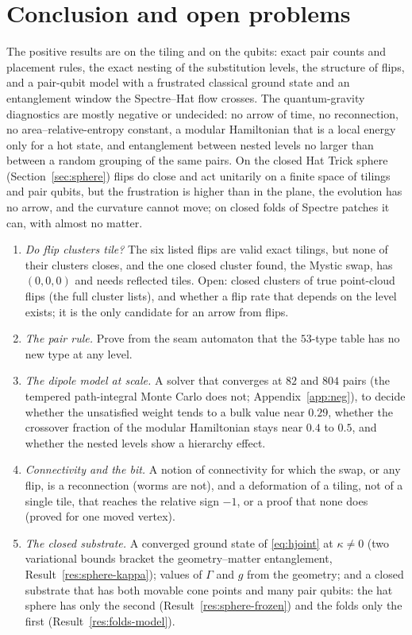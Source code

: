 \documentclass[11pt]{article}
\theoremstyle{definition}
\begin{document}
\section{Conclusion and open problems}
The positive results are on the tiling and on the qubits: exact pair counts and placement rules, the exact nesting of the substitution levels, the structure of flips, and a pair-qubit model with a frustrated classical ground state and an entanglement window the Spectre--Hat flow crosses. The quantum-gravity diagnostics are mostly negative or undecided: no arrow of time, no reconnection, no area--relative-entropy constant, a modular Hamiltonian that is a local energy only for a hot state, and entanglement between nested levels no larger than between a random grouping of the same pairs. On the closed Hat Trick sphere (Section~\ref{sec:sphere}) flips do close and act unitarily on a finite space of tilings and pair qubits, but the frustration is higher than in the plane, the evolution has no arrow, and the curvature cannot move; on closed folds of Spectre patches it can, with almost no matter.
\begin{enumerate}[leftmargin=1.6em,itemsep=1pt]
\item \emph{Do flip clusters tile?} The six listed flips are valid exact tilings, but none of their clusters closes, and the one closed cluster found, the Mystic swap, has $(0,0,0)$ and needs reflected tiles. Open: closed clusters of true point-cloud flips (the full cluster lists), and whether a flip rate that depends on the level exists; it is the only candidate for an arrow from flips.
\item \emph{The pair rule.} Prove from the seam automaton that the $53$-type table has no new type at any level.
\item \emph{The dipole model at scale.} A solver that converges at $82$ and $804$ pairs (the tempered path-integral Monte Carlo does not; Appendix~\ref{app:neg}), to decide whether the unsatisfied weight tends to a bulk value near $0.29$, whether the crossover fraction of the modular Hamiltonian stays near $0.4$ to $0.5$, and whether the nested levels show a hierarchy effect.
\item \emph{Connectivity and the bit.} A notion of connectivity for which the swap, or any flip, is a reconnection (worms are not), and a deformation of a tiling, not of a single tile, that reaches the relative sign $-1$, or a proof that none does (proved for one moved vertex).
\item \emph{The closed substrate.} A converged ground state of \eqref{eq:hjoint} at $\kappa\neq0$ (two variational bounds bracket the geometry--matter entanglement, Result~\ref{res:sphere-kappa}); values of $\Gamma$ and $g$ from the geometry; and a closed substrate that has both movable cone points and many pair qubits: the hat sphere has only the second (Result~\ref{res:sphere-frozen}) and the folds only the first (Result~\ref{res:folds-model}).
\end{enumerate}
\end{document}

